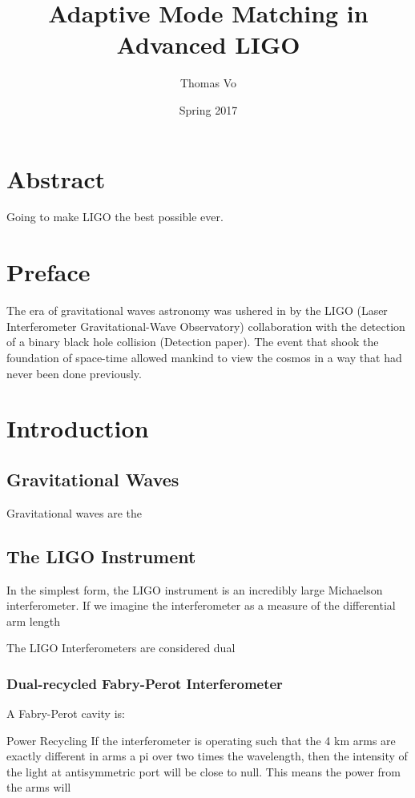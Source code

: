 \documentclass[10pt,a4paper]{book}
\title{Adaptive Mode Matching in Advanced LIGO}
\date{Spring 2017}
\author{Thomas Vo}
\begin{document}
\begin{linenumbers}
		\chapter*{Abstract}
		Going to make LIGO the best possible ever.
	
	\maketitle
		\chapter*{Preface}
		The era of gravitational waves astronomy was ushered in by the LIGO (Laser Interferometer Gravitational-Wave Observatory) collaboration with the detection of a binary black hole collision (Detection paper).  The event that shook the foundation of space-time allowed mankind to view the cosmos in a way that had never been done previously. 
	\tableofcontents

\chapter{Introduction}
	\section{Gravitational Waves}
	Gravitational waves are the 
	
	
	
	\section{The LIGO Instrument}
	In the simplest form, the LIGO instrument is an incredibly large Michaelson interferometer.  If we imagine the interferometer as a measure of the differential arm length 
	
		
	The LIGO Interferometers are considered dual 
	
		\subsection{Dual-recycled Fabry-Perot Interferometer}
		A Fabry-Perot cavity is:
		
		Power Recycling
		If the interferometer is operating such that the 4 km arms are exactly different in arms a pi over two times the wavelength, then the intensity of the light at antisymmetric port will be close to null.  This means the power from the arms will
		

\end{linenumbers}
\end{document}
